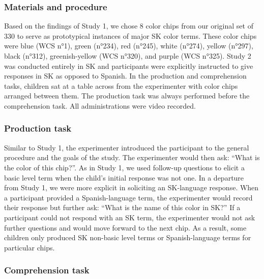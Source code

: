 \documentclass[
  ,apa7,floatsintext]{apa6}
\begin{document}
\hypertarget{materials-and-procedure-1}{%
\subsubsection{Materials and procedure}\label{materials-and-procedure-1}}

Based on the findings of Study 1, we chose 8 color chips from our original set of 330 to serve as prototypical instances of major SK color terms. These color chips were blue (WCS n°1), green (n°234), red (n°245), white (n°274), yellow (n°297), black (n°312), greenish-yellow (WCS n°320), and purple (WCS n°325). Study 2 was conducted entirely in SK and participants were explicitly instructed to give responses in SK as opposed to Spanish. In the production and comprehension tasks, children sat at a table across from the experimenter with color chips arranged between them. The production task was always performed before the comprehension task. All administrations were video recorded.

\hypertarget{production-task}{%
\subsubsection{Production task}\label{production-task}}

Similar to Study 1, the experimenter introduced the participant to the general procedure and the goals of the study. The experimenter would then ask: ``What is the color of this chip?''. As in Study 1, we used follow-up questions to elicit a basic level term when the child's initial response was not one. In a departure from Study 1, we were more explicit in soliciting an SK-language response. When a participant provided a Spanish-language term, the experimenter would record their response but further ask: ``What is the name of this color in SK?'' If a participant could not respond with an SK term, the experimenter would not ask further questions and would move forward to the next chip. As a result, some children only produced SK non-basic level terms or Spanish-language terms for particular chips.

\hypertarget{comprehension-task}{%
\subsubsection{Comprehension task}\label{comprehension-task}}
\end{document}
